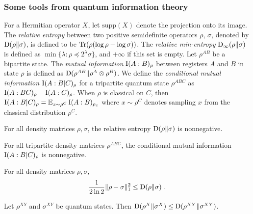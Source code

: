 \subsubsection{Some tools from quantum information theory}

For a Hermitian operator $X$, let $\mathrm{supp}(X)$ denote the projection onto its image. The \emph{relative entropy} between two positive semidefinite operators $\rho$, $\sigma$, denoted by $\mathrm{D}(\rho \| \sigma)$, is defined to be $\mbox{\rm Tr}(\rho (\log \rho - \log \sigma))$. The \emph{relative min-entropy} $\mathrm{D}_\infty(\rho \| \sigma)$ is defined as $\min\{ \lambda : \rho \preceq 2^\lambda \sigma \}$, and $+\infty$ if this set is empty. Let $\rho^{AB}$ be a bipartite state. The \emph{mutual information} $\mathrm{I}(A:B)_\rho$ between registers $A$ and $B$ in state $\rho$ is defined as $\mathrm{D}(\rho^{AB} \| \rho^A \otimes \rho^B)$. We define the \emph{conditional mutual information} $\mathrm{I}(A:B|C)_\rho$ for a tripartite quantum state $\rho^{ABC}$ as $\mathrm{I}(A:BC)_\rho - \mathrm{I}(A:C)_\rho$. When $\rho$ is classical on $C$, then $\mathrm{I}(A:B|C)_\rho = \operatorname*{\mathbb{E}}_{x \sim \rho^C} \mathrm{I}(A:B)_{\rho_x}$ where $x \sim \rho^C$ denotes sampling $x$ from the classical distribution $\rho^C$.

\begin{proposition}
\label{prop:relative_entropy_nonneg}
For all density matrices $\rho, \sigma$, the relative entropy $\mathrm{D}(\rho \| \sigma)$ is nonnegative.
\end{proposition}

\begin{proposition}
\label{prop:ssa}
For all tripartite density matrices $\rho^{ABC}$, the conditional mutual information $\mathrm{I}(A:B|C)_\rho$ is nonnegative.
\end{proposition}

\begin{proposition}
\label{prop:pinsker}
	For all density matrices $\rho, \sigma$, 
	\[
		 \frac{1}{2 \ln 2} \| \rho - \sigma \|^2_1 \leq \mathrm{D}(\rho \| \sigma)~.
	\]
\end{proposition}


\begin{proposition}
\label{prop:divergence_data_processing}
Let $\rho^{XY}$ and $\sigma^{XY}$ be quantum states. Then $\mathrm{D}(\rho^{X} \| \sigma^X) \leq \mathrm{D}(\rho^{XY} \| \sigma^{XY})$.
\end{proposition}

